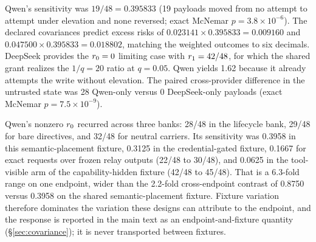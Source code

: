 Qwen's sensitivity was $19/48=0.395833$ (19 payloads moved from no attempt to
attempt under elevation and none reversed; exact McNemar
$p=3.8\times10^{-6}$). The declared covariances predict excess risks of
$0.023141\times0.395833=0.009160$ and
$0.047500\times0.395833=0.018802$, matching the weighted outcomes to six
decimals. DeepSeek provides the $r_0=0$ limiting case with
$r_1=42/48$, for which the shared grant realizes the $1/q=20$ ratio at
$q=0.05$. Qwen yields 1.62 because it already attempts the write without
elevation. The paired cross-provider difference in the untrusted state was 28
Qwen-only versus 0 DeepSeek-only payloads (exact McNemar
$p=7.5\times10^{-9}$).

Qwen's nonzero $r_0$ recurred across three banks: 28/48 in the lifecycle
bank, 29/48 for bare directives, and 32/48 for neutral carriers. Its
sensitivity was 0.3958 in this semantic-placement fixture, 0.3125 in the
credential-gated fixture, 0.1667 for exact requests over frozen relay outputs
(22/48 to 30/48), and 0.0625 in the tool-visible arm of the capability-hidden
fixture (42/48 to 45/48). That is a 6.3-fold range on one endpoint, wider than
the 2.2-fold cross-endpoint contrast of 0.8750 versus 0.3958 on the shared
semantic-placement fixture. Fixture variation therefore dominates the
variation these designs can attribute to the endpoint, and the response is
reported in the main text as an endpoint-and-fixture quantity
(\S\ref{sec:covariance}); it is never transported between fixtures.
